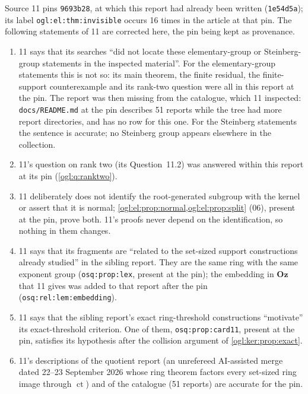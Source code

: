 \documentclass[11pt,oneside]{article}
\numberwithin{equation}{section}
\theoremstyle{definition}
\theoremstyle{remark}
\newcommand{\Oz}{\mathbf{Oz}}
\newcommand{\ct}{\operatorname{ct}}
\newcommand{\replabel}[1]{\nolinkurl{#1}}
\newcommand{\fn}[1]{\nolinkurl{#1}}
\begin{document}
Source 11 pins \texttt{9693b28}, at which this report had already been written
(\texttt{1e54d5a}); its label \replabel{ogl:el:thm:invisible} occurs 16 times in
the article at that pin. The following statements of 11 are corrected here, the
pin being kept as provenance.
\begin{enumerate}[leftmargin=*,resume]
\item 11 says that its searches ``did not locate these elementary-group or
Steinberg-group statements in the inspected material''. For the elementary-group
statements this is not so: its main theorem, the finite residual, the
finite-support counterexample and its rank-two question were all in this report
at the pin. The report was then missing from the catalogue, which 11 inspected:
\fn{docs/README.md} at the pin describes 51 reports while the tree had more report
directories, and has no row for this one. For the Steinberg statements the
sentence is accurate; no Steinberg group appears elsewhere in the collection.
\item 11's question on rank two (its Question~11.2) was answered within this
report at its pin (\cref{ogl:q:ranktwo}).
\item 11 deliberately does not identify the root-generated subgroup with the
kernel or assert that it is normal; \cref{ogl:el:prop:normal,ogl:el:prop:split}
(06), present at the pin, prove both. 11's proofs never depend on the
identification, so nothing in them changes.
\item 11 says that its fragments are ``related to the set-sized support
constructions already studied'' in the sibling report. They are the same ring
with the same exponent group (\replabel{osq:prop:lex}, present at the pin); the
embedding in $\Oz$ that 11 gives was added to that report after the pin
(\replabel{osq:rel:lem:embedding}).
\item 11 says that the sibling report's exact ring-threshold constructions
``motivate'' its exact-threshold criterion. One of them,
\replabel{osq:prop:card11}, present at the pin, satisfies its hypothesis after
the collision argument of \cref{ogl:ker:prop:exact}.
\item 11's descriptions of the quotient report (an unrefereed AI-assisted merge
dated 22--23 September 2026 whose ring theorem factors every set-sized ring image
through $\ct$) and of the catalogue (51 reports) are accurate for the pin.
\end{enumerate}
\end{document}
